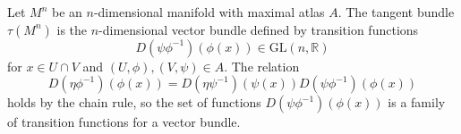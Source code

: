 Let $M^n$ be an $n$-dimensional manifold with maximal atlas $A$. The tangent bundle $\tau(M^n)$ is the $n$-dimensional vector bundle defined by transition functions
$$D(\psi \phi^{-1})(\phi(x)) \in \mathrm{GL}(n, \mathbb{R})$$
for $x \in U \cap V$ and $(U, \phi), (V, \psi) \in A$. The relation
$$D(\eta \phi^{-1})(\phi(x)) = D(\eta \psi^{-1})(\psi(x)) D(\psi \phi^{-1})(\phi(x))$$
holds by the chain rule, so the set of functions $D(\psi \phi^{-1})(\phi(x))$ is a family of transition functions for a vector bundle.
